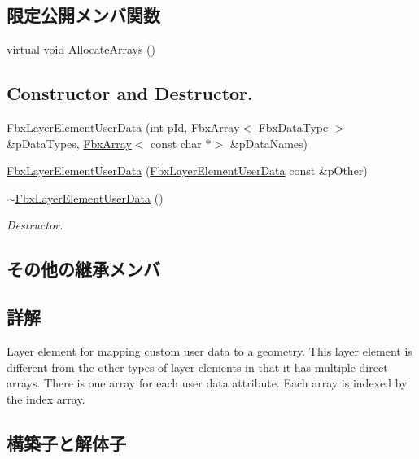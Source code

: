 \subsection*{限定公開メンバ関数}
\begin{DoxyCompactItemize}
\item 
virtual void \hyperlink{class_fbx_layer_element_user_data_afd9b9cec3547a1a5ccde15f274128d2a}{Allocate\+Arrays} ()
\end{DoxyCompactItemize}
\subsection*{Constructor and Destructor.}
\begin{DoxyCompactItemize}
\item 
\hyperlink{class_fbx_layer_element_user_data_a5f39fe7e33c61558f7b92b79c4c3f81b}{Fbx\+Layer\+Element\+User\+Data} (int p\+Id, \hyperlink{class_fbx_array}{Fbx\+Array}$<$ \hyperlink{class_fbx_data_type}{Fbx\+Data\+Type} $>$ \&p\+Data\+Types, \hyperlink{class_fbx_array}{Fbx\+Array}$<$ const char $\ast$$>$ \&p\+Data\+Names)
\item 
\hyperlink{class_fbx_layer_element_user_data_aa64b5222f1e7cb1091b92317b7516969}{Fbx\+Layer\+Element\+User\+Data} (\hyperlink{class_fbx_layer_element_user_data}{Fbx\+Layer\+Element\+User\+Data} const \&p\+Other)
\item 
\hyperlink{class_fbx_layer_element_user_data_a77cda3570c8b9d92d8c5360c008bdca2}{$\sim$\+Fbx\+Layer\+Element\+User\+Data} ()
\begin{DoxyCompactList}\small\item\em Destructor. \end{DoxyCompactList}\end{DoxyCompactItemize}
\subsection*{その他の継承メンバ}


\subsection{詳解}
Layer element for mapping custom user data to a geometry. This layer element is different from the other types of layer elements in that it has multiple direct arrays. There is one array for each user data attribute. Each array is indexed by the index array. 

\subsection{構築子と解体子}
\mbox{\label{class_fbx_layer_element_user_data_a5f39fe7e33c61558f7b92b79c4c3f81b}} 
